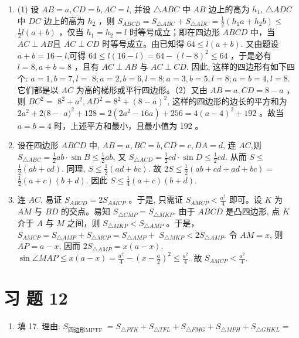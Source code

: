 \documentclass[10pt]{article}
\begin{document}
\begin{enumerate}
  \item (1) 设 $A B=a, C D=b, A C=l$, 并设 $\triangle A B C$ 中 $A B$ 边上的高为 $h_{1}$, $\triangle A D C$ 中 $D C$ 边上的高为 $h_{2}$ ，则 $S_{A B C D}=S_{\triangle A B C}+S_{\triangle A D C}=\frac{1}{2}\left(h_{1} a+h_{2} b\right) \leqslant$ $\frac{1}{2} l(a+b)$ ，仅当 $h_{1}=h_{2}=l$ 时等号成立；即在四边形 $A B C D$ 中，当 $A C \perp A B$且 $A C \perp C D$ 时等号成立。由已知得 $64 \leqslant l(a+b)$. 又由题设 $a+b=16-l$,可得 $64 \leqslant l(16-l)=64-(l-8)^{2} \leqslant 64$ ，于是必有 $l=8, a+b=8$ ，且有 $A C \perp A B$ 与 $A C \perp C D$. 因此, 这样的四边形有如下四个: $a=1, b=7, l=$ $8 ; a=2, b=6, l=8 ; a=3, b=5, l=8 ; a=b=4, l=8$. 它们都是以 $A C$ 为高的梯形或平行四边形。（2）又由 $A B=a, C D=8-a$ ，则 $B C^{2}=$ $8^{2}+a^{2}, A D^{2}=8^{2}+(8-a)^{2}$, 这样的四边形的边长的平方和为 $2 a^{2}+2(8-$ $a)^{2}+128=2\left(2 a^{2}-16 a\right)+256=4(a-4)^{2}+192$ 。故当 $a=b=4$ 时，上述平方和最小，且最小值为 192 。
  \item 设在四边形 $A B C D$ 中, $A B=a, B C=b, C D=c, D A=d$, 连 $A C$,则 $S_{\triangle A B C}=\frac{1}{2} a b \cdot \sin B \leqslant \frac{1}{2} a b$, 又 $S_{\triangle A C D}=\frac{1}{2} c d \cdot \sin D \leqslant \frac{1}{2} c d$. 从而 $S \leqslant$ $\frac{1}{2}(a b+c d)$. 同理, $S \leqslant \frac{1}{2}(a d+b c)$. 故 $2 S \leqslant \frac{1}{2}(a b+c d+a d+b c)=$ $\frac{1}{2}(a+c)(b+d)$. 因此 $S \leqslant \frac{1}{4}(a+c)(b+d)$.
  \item 连 $A C$, 易证 $S_{A B C D}=2 S_{A M C P}$ 。于是, 只需证 $S_{A M C P}<\frac{a^{2}}{4}$ 即可。设 $K$ 为 $A M$ 与 $B D$ 的交点。易知 $S_{\triangle C M P}=S_{\triangle M K P}$. 由于 $A B C D$ 是凸四边形, 点 $K$ 介于 $A$ 与 $M$ 之间，则 $S_{\triangle M K P}<S_{\triangle A M P}$ 。于是， $S_{A M C P}=S_{\triangle A M P}+S_{\triangle M C P}=S_{\triangle A M P}+$ $S_{\triangle M K P}<2 S_{\triangle A M P}$. 令 $A M=x$, 则 $A P=a-x$, 因而 $2 S_{\triangle A M P}=x(a-x)$. $\sin \angle M A P \leqslant x(a-x)=\frac{a^{2}}{4}-\left(x-\frac{a}{2}\right)^{2} \leqslant \frac{a^{2}}{4}$. 故 $S_{A M C P}<\frac{a^{2}}{4}$.
\end{enumerate}

\section*{习 题 12}
\begin{enumerate}
  \item 填 17. 理由: $S_{\text {四边形MPTF }}=S_{\triangle P T K}+S_{\triangle T F L}+S_{\triangle F M G}+S_{\triangle M P H}+S_{\triangle G H K L}=$
\end{enumerate}
\end{document}
